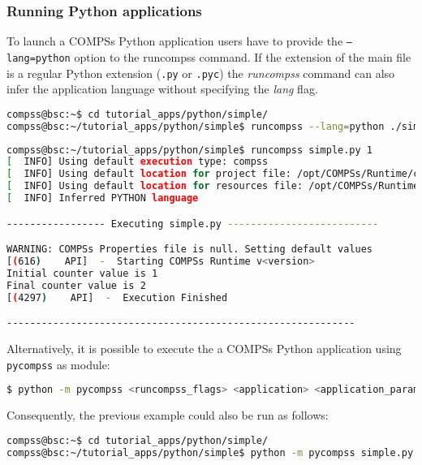 \subsubsection{Running Python applications}
To launch a COMPSs Python application users have to provide the \texttt{--lang=python} option to the runcompss command. If the extension
of the main file is a regular Python extension (\verb|.py| or \verb|.pyc|) the \textit{runcompss} command can also infer the 
application language without specifying the \textit{lang} flag. 

\begin{lstlisting}[language=bash]
compss@bsc:~$ cd tutorial_apps/python/simple/
compss@bsc:~/tutorial_apps/python/simple$ runcompss --lang=python ./simple.py <initial_number>
\end{lstlisting}

\begin{lstlisting}[language=bash]
compss@bsc:~/tutorial_apps/python/simple$ runcompss simple.py 1
[  INFO] Using default execution type: compss
[  INFO] Using default location for project file: /opt/COMPSs/Runtime/configuration/xml/projects/default_project.xml
[  INFO] Using default location for resources file: /opt/COMPSs/Runtime/configuration/xml/resources/default_resources.xml
[  INFO] Inferred PYTHON language

----------------- Executing simple.py --------------------------

WARNING: COMPSs Properties file is null. Setting default values
[(616)    API]  -  Starting COMPSs Runtime v<version>
Initial counter value is 1
Final counter value is 2
[(4297)    API]  -  Execution Finished

------------------------------------------------------------
\end{lstlisting}

Alternatively, it is possible to execute the a COMPSs Python application using \verb|pycompss| as module:

\begin{lstlisting}[language=bash]
$ python -m pycompss <runcompss_flags> <application> <application_parameters>
\end{lstlisting}

Consequently, the previous example could also be run as follows:

\begin{lstlisting}[language=bash]
compss@bsc:~$ cd tutorial_apps/python/simple/
compss@bsc:~/tutorial_apps/python/simple$ python -m pycompss simple.py <initial_number>
\end{lstlisting}

